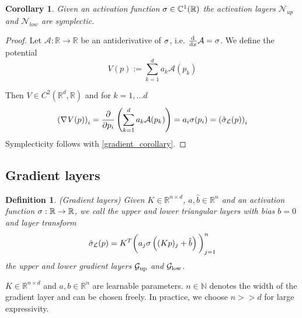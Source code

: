 \documentclass[twoside,a4paper]{article}
\newtheorem{definition}{Definition}
\newtheorem{corollary}{Corollary}
\begin{document}
\begin{corollary}
	Given an activation function $\sigma \in \mathbb{C}^1(\mathbb{R})$
	the activation layers $\mathcal{N}_{up}$ and $\mathcal{N}_{low}$ are symplectic.
\end{corollary}
\begin{proof}
	Let $\mathcal{A}: \mathbb{R} \to \mathbb{R}$ be an antiderivative of $\sigma$, 
	i.e. $\frac{\mathrm{d}^{}}{\mathrm{d}x} \mathcal{A} = \sigma$. We define the potential
	\begin{equation*}
		V(p) := \sum_{k=1}^d a_k \mathcal{A}(p_k)
	\end{equation*}

	Then $V \in C^2(\mathbb{R}^d, \mathbb{R})$ and for $k=1, \dots d$
	\begin{equation*}
		\left( \nabla_{}{V}(p) \right)_i = \frac{\partial }{\partial p_i} \left( \sum_{k=1}^d a_k \mathcal{A}(p_k) \right)
		= a_i \sigma(p_i) = \left( \hat{\sigma}_{\mathcal{L}}(p) \right)_i
	\end{equation*}
	Symplecticity follows with \cref{gradient_corollary}.
\end{proof}

\subsection{Gradient layers}

\begin{definition}
	(Gradient layers)
	Given $K \in \mathbb{R}^{n \times d}$, $a,\hat{b} \in \mathbb{R}^n$ and
	an activation function $\sigma : \mathbb{R} \to \mathbb{R}$,
	we call the upper and lower triangular layers with bias $b=0$ and layer transform
	\begin{equation*}
		\hat{\sigma}_{\mathcal{L}}(p) = K^T \bigg( a_j \sigma \left( (Kp)_j + \hat{b} \right) \bigg)_{j=1}^n
	\end{equation*}
	the upper and lower gradient layers $\mathcal{G}_{\text{up}}$ and $\mathcal{G}_{\text{low}}$.
\end{definition}
$K \in \mathbb{R}^{n \times d}$ and $a,b \in \mathbb{R}^n$
are learnable parameters. 
$n \in \mathbb{N}$ denotes the width of the gradient layer and can be chosen freely.
In practice, we choose $n >> d$ for large expressivity.
\end{document}
